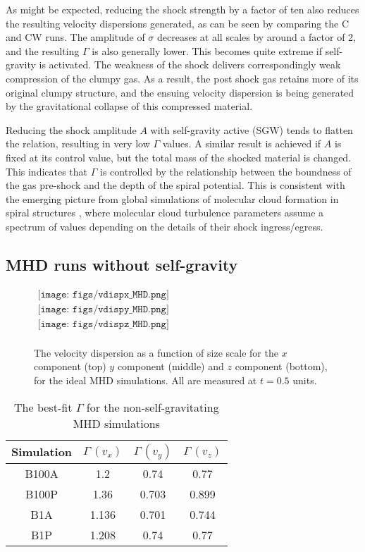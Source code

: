 \documentclass[a4paper,fleqn,usenatbib]{mnras}
\begin{document}
As might be expected, reducing the shock strength by a factor of ten also reduces the resulting velocity dispersions generated, as can be seen by comparing the C and CW runs.  The amplitude of $\sigma$ decreases at all scales by around a factor of 2, and the resulting $\Gamma$ is also generally lower.  This becomes quite extreme if self-gravity is activated.  The weakness of the shock delivers correspondingly weak compression of the clumpy gas.  As a result, the post shock gas retains more of its original clumpy structure, and the ensuing velocity dispersion is being generated by the gravitational collapse of this compressed material.

Reducing the shock amplitude $A$ with self-gravity active (SGW) tends to flatten the relation, resulting in very low $\Gamma$ values.  A similar result is achieved if $A$ is fixed at its control value, but the total mass of the shocked material is changed.  This indicates that $\Gamma$ is controlled by the relationship between the boundness of the gas pre-shock and the depth of the spiral potential.  This is consistent with the emerging picture from global simulations of molecular cloud formation in spiral structures \citep[e.g.][]{Jin2017}, where molecular cloud turbulence parameters assume a spectrum of values depending on the details of their shock ingress/egress.

\subsection{MHD runs without self-gravity}


\begin{figure*}
\begin{center}
$\begin{array}{c}
\texttt{[image: figs/vdispx\_MHD.png]} \\
\texttt{[image: figs/vdispy\_MHD.png]} \\
\texttt{[image: figs/vdispz\_MHD.png]} \\
\end{array}$
\end{center}
\caption{The velocity dispersion as a function of size scale for the $x$ component (top) $y$ component (middle) and $z$ component (bottom), for the ideal MHD simulations.  All are measured at $t=0.5$ units.}
\label{fig:MHD_runs}
\end{figure*}

\begin{table}
\centering
  \caption{The best-fit $\Gamma$ for the non-self-gravitating MHD simulations \label{tab:MHD_fits}}
  \begin{tabular}{c | ccc}
  \hline
  \hline
   Simulation  &  $\Gamma \,(v_x)$ & $\Gamma \,(v_y)$& $\Gamma \,(v_z)$ \\
   \hline
   B100A & 1.2 & 0.74 & 0.77 \\
   B100P  & 1.36 & 0.703 & 0.899 \\
   B1A & 1.136 & 0.701 & 0.744 \\
   B1P  & 1.208 & 0.74 & 0.77 \\
 \hline
  \hline
\end{tabular}
\end{table}
\end{document}
